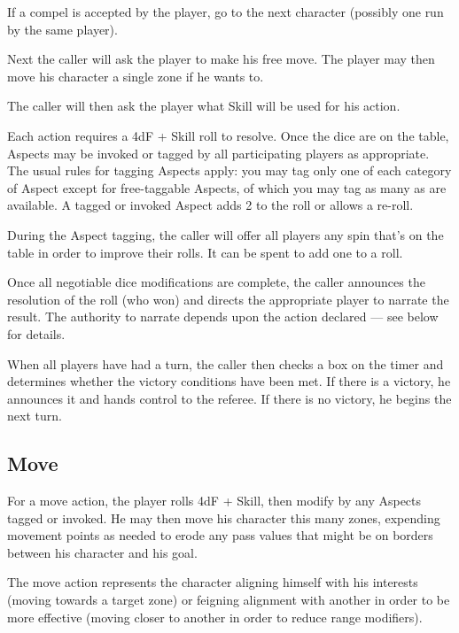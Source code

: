 If a compel is accepted by the player, go to the next character (possibly one run by the same player).

Next the caller will ask the player to make his free move. The player may then move his character a single zone if he wants to.

The caller will then ask the player what Skill will be used for his action.


Each action requires a 4dF + Skill roll to resolve. Once the dice are on the table, Aspects may be invoked or tagged by all participating players as appropriate. The usual rules for tagging Aspects apply: you may tag only one of each category of Aspect except for free-taggable Aspects, of which you may tag as many as are available. A tagged or invoked Aspect adds 2 to the roll or allows a re-roll.

During the Aspect tagging, the caller will offer all players any spin that's on the table in order to improve their rolls. It can be spent to add one to a roll.

Once all negotiable dice modifications are complete, the caller announces the resolution of the roll (who won) and directs the appropriate player to narrate the result. The authority to narrate depends upon the action declared --- see below for details.

When all players have had a turn, the caller then checks a box on the timer and determines whether the victory conditions have been met. If there is a victory, he announces it and hands control to the referee. If there is no victory, he begins the next turn.

\subsection{Move}\label{sec:Move}

For a move action, the player rolls 4dF + Skill, then modify by any Aspects tagged or invoked. He may then move his character this many zones, expending movement points as needed to erode any pass values that might be on borders between his character and his goal.

The move action represents the character aligning himself with his interests (moving towards a target zone) or feigning alignment with another in order to be more effective (moving closer to another in order to reduce range modifiers).

